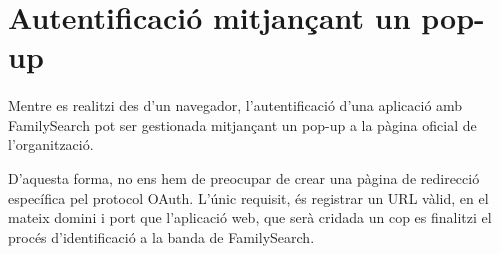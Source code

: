 \section{Autentificació mitjançant un pop-up}

    \paragraph{}
    Mentre es realitzi des d'un navegador, l'autentificació d’una aplicació amb FamilySearch pot ser gestionada mitjançant un pop-up a la pàgina oficial de l’organització.

    D'aquesta forma, no ens hem de preocupar de crear una pàgina de redirecció específica pel protocol OAuth. L'únic requisit, és registrar un URL vàlid, en el mateix domini i port que l’aplicació web, que serà cridada un cop es finalitzi el procés d'identificació a la banda de FamilySearch.
